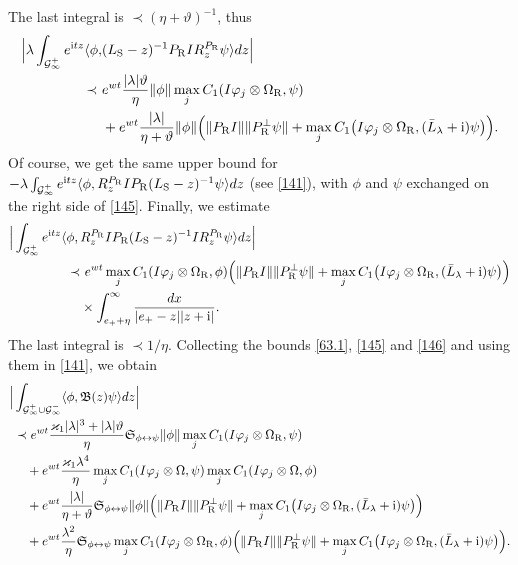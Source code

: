 \documentclass[letterpaper,onecolumn,11pt,accepted=2021-12-09]{quantumarticle}
\numberwithin{equation}{section}
\newcommand{\sym}{ {\mathfrak S}_{\phi\leftrightarrow\psi}}
\renewcommand{\r}{{\rm R}}
\newcommand{\s}{{\rm S}}
\renewcommand{\i}{{\rm i}}
\begin{document}
The last integral is $\prec (\eta+\vartheta)^{-1}$, thus 
\begin{align}
\Big| \lambda \int_{{\mathcal G}_\infty^+}e^{\i tz}\langle\phi, & (L_\s-z)^{-1} P_\r IR_z^{P_\r}\psi\rangle dz\Big|\nonumber\\
\prec\  &  e^{wt} \frac{|\lambda|\vartheta}{\eta} \|\phi\| \max_j C_1(I\varphi_j\otimes\Omega_\r,\psi)\nonumber\\
&  + e^{wt}\frac{|\lambda| }{\eta+\vartheta}\|\phi\|\Big( \|P_\r I\| \|P^\perp_\r\psi\| + \max_j C_1\big(I\varphi_j\otimes\Omega_\r,(\bar L_\lambda+\i)\psi\big)\Big).
\label{145}
\end{align}
Of course, we get the same upper bound for $-\lambda \int_{{\mathcal G}_\infty^+}e^{\i tz}\langle\phi, R_z^{P_\r} I P_\r (L_\s-z)^{-1} \psi\rangle dz$ (see \eqref{141}), with $\phi$ and $\psi$ exchanged on the right side of \eqref{145}. Finally, we estimate 
\begin{align}
\Big| \int_{{\mathcal G}_\infty^+} e^{\i tz}\langle \phi, \, & R_z^{P_\r} IP_\r (L_\s-z)^{-1} IR_z^{P_\r} \psi\rangle d z\Big| \nonumber\\
\prec & \ e^{wt} \max_j C_1(I\varphi_j\otimes\Omega_\r, \phi)\Big( \|P_\r I\| \|P^\perp_\r\psi\| + \max_j C_1\big(I\varphi_j\otimes\Omega_\r,(\bar L_\lambda+\i)\psi\big)\Big)\nonumber\\
& \times \int_{e_++\eta}^\infty \frac{dx }{|e_+-z| |z+\i|}.
\label{146}
\end{align}
The last integral is $\prec 1/\eta$.  Collecting the bounds \eqref{63.1}, \eqref{145} and \eqref{146} and using them in \eqref{141}, we obtain
\begin{align}
\Big| & \int_{{\mathcal G}_\infty^+\cup {\mathcal G}_\infty^-} \langle \phi, {\mathfrak B}(z)\psi\rangle dz\Big|\nonumber\\
& \prec   e^{wt} \frac{\varkappa_1|\lambda|^3+|\lambda|\vartheta }{\eta} 
 \sym \|\phi\|  \max_j C_1(I\varphi_j\otimes\Omega_\r,\psi) \nonumber\\
&  \quad + e^{wt} \frac{\varkappa_1\lambda^4}{\eta}  \max_j C_1(I\varphi_j\otimes\Omega,\psi) \max_j C_1(I\varphi_j\otimes\Omega,\phi) \nonumber\\
&  \quad + e^{wt}\frac{|\lambda| }{\eta+\vartheta} \sym \|\phi\| \Big(  \|P_\r I\|  \|P^\perp_\r\psi\|+ \max_j C_1\big(I\varphi_j\otimes\Omega_\r,(\bar L_\lambda+\i)\psi\big) \Big)\nonumber\\
& \quad + e^{wt}\frac{\lambda^2}{\eta}  \sym \max_j C_1(I\varphi_j\otimes\Omega_\r, \phi)\Big( \|P_\r I\| \|P^\perp_\r\psi\| + \max_j C_1\big(I\varphi_j\otimes\Omega_\r,(\bar L_\lambda+\i)\psi\big)\Big).
\label{148}
\end{align}
\end{document}
